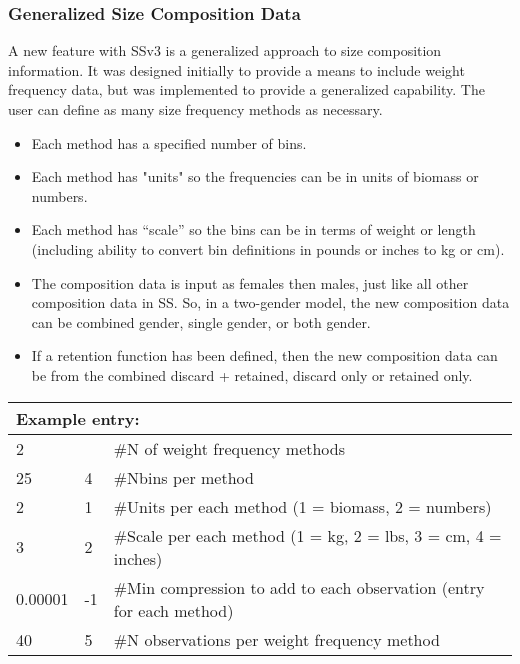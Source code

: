\subsubsection{Generalized Size Composition Data}
A new feature with SS\textunderscore v3 is a generalized approach to size composition information.  It was designed initially to provide a means to include weight frequency data, but was implemented to provide a generalized capability.  The user can define as many size frequency methods as necessary.

\begin{itemize}
	\item Each method has a specified number of bins.
	\item Each method has "units" so the frequencies can be in units of biomass or numbers.
	\item Each method has “scale” so the bins can be in terms of weight or length (including ability to convert bin definitions in pounds or inches to kg or cm). 
	\item The composition data is input as females then males, just like all other composition data in SS.  So, in a two-gender model, the new composition data can be combined gender, single gender, or both gender.
	\item If a retention function has been defined, then the new composition data can be from the combined discard + retained, discard only or retained only.
\end{itemize}

\begin{center}
	\begin{tabular}{p{1.4cm} p{0.5cm} p{13 cm}}
		\multicolumn{3}{l}{Example entry:}\\
		\hline
		2 &  & \#N of weight frequency methods\\
		\hline
		25 & 4 & \#Nbins per method\\
		\hline
		2 & 1 & \#Units per each method (1 = biomass, 2 = numbers)\\
		\hline
		3 & 2 & \#Scale per each method (1 = kg, 2 = lbs, 3 = cm, 4 = inches)\\
		\hline
		0.00001 & -1 & \#Min compression to add to each observation (entry for each method)\\
		\hline
		40 & 5 & \#N observations per weight frequency method \\
		\hline
	\end{tabular}
\end{center}

